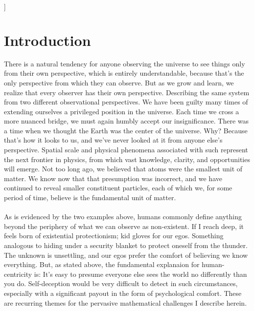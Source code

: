 \documentclass[twoside,twocolumn,9pt]{article}
\begin{document}
\begin{@twocolumnfalse}
 \end{@twocolumnfalse} \vspace{0.6cm}

  ]

\renewcommand*\rmdefault{bch}\normalfont\upshape
\rmfamily
\vspace{-1cm}
\section{Introduction}
There is a natural tendency for anyone observing the universe to see things only from their own perspective, which is entirely understandable, because that's the only perspective from which they can observe. But as we grow and learn, we realize that every observer has their own perspective. Describing the same system from two different observational perspectives. We have been guilty many times of extending ourselves a privileged position in the universe. Each time we cross a more nuanced bridge, we must again humbly accept our insignificance. There was a time when we thought the Earth was the center of the universe. Why? Because that's how it looks to us, and we've never looked at it from anyone else's perspective. Spatial scale and physical phenomena associated with such represent the next frontier in physics, from which vast knowledge, clarity, and opportunities will emerge. Not too long ago, we believed that atoms were the smallest unit of matter. We know now that that presumption was incorrect, and we have continued to reveal smaller constituent particles, each of which we, for some period of time, believe is the fundamental unit of matter.\\
\\
As is evidenced by the two examples above, humans commonly define anything beyond the periphery of what we can observe as non-existent. If I reach deep, it feels born of existential protectionism; kid gloves for our egos. Something analogous to hiding under a security blanket to protect oneself from the thunder. The unknown is unsettling, and our egos prefer the comfort of believing we know everything. But, as stated above, the fundamental explanaion for human-centricity is: It's easy to presume everyone else sees the world no differently than you do. Self-deception would be very difficult to detect in such circumstances, especially with a significant payout in the form of psychological comfort. These are recurring themes for the pervasive mathematical challenges I describe herein.
\end{document}
